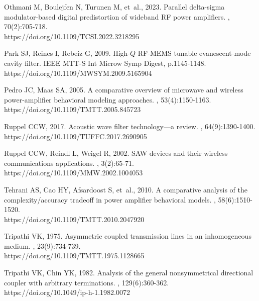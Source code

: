 \documentclass[twoside,twocolumn]{article}
\begin{document}
{{\begin{thebibliography}{}
Othmani M, Boulejfen N, Turunen M, {et~al.}, 2023.
\newblock Parallel delta-sigma modulator-based digital predistortion of wideband RF power amplifiers.
, 70(2):705-718. \\
  https://doi.org/10.1109/TCSI.2022.3218295

Park SJ, Reines I, Rebeiz G, 2009.
\newblock High-$Q$ RF-MEMS tunable evanescent-mode cavity filter.
\newblock IEEE MTT-S Int Microw Symp Digest, p.1145-1148. \\
  https://doi.org/10.1109/MWSYM.2009.5165904

Pedro JC, Maas SA, 2005.
\newblock A comparative overview of microwave and wireless power-amplifier behavioral modeling approaches.
, 53(4):1150-1163. \\
  https://doi.org/10.1109/TMTT.2005.845723

Ruppel CCW, 2017.
\newblock Acoustic wave filter technology---a review.
, 64(9):1390-1400. \\
  https://doi.org/10.1109/TUFFC.2017.2690905



Ruppel CCW, Reindl L, Weigel R, 2002.
\newblock SAW devices and their wireless communications applications.
, 3(2):65-71. \\
  https://doi.org/10.1109/MMW.2002.1004053

Tehrani AS, Cao HY, Afsardoost S, {et~al.}, 2010.
\newblock A comparative analysis of the complexity/accuracy tradeoff in power amplifier behavioral models.
, 58(6):1510-1520. \\
  https://doi.org/10.1109/TMTT.2010.2047920

Tripathi VK, 1975.
\newblock Asymmetric coupled transmission lines in an inhomogeneous medium.
, 23(9):734-739. \\
  https://doi.org/10.1109/TMTT.1975.1128665

Tripathi VK, Chin YK, 1982.
\newblock Analysis of the general nonsymmetrical directional coupler with arbitrary terminations.
, 129(6):360-362. \\
  https://doi.org/10.1049/ip-h-1.1982.0072


\end{thebibliography}}}
\end{document}
